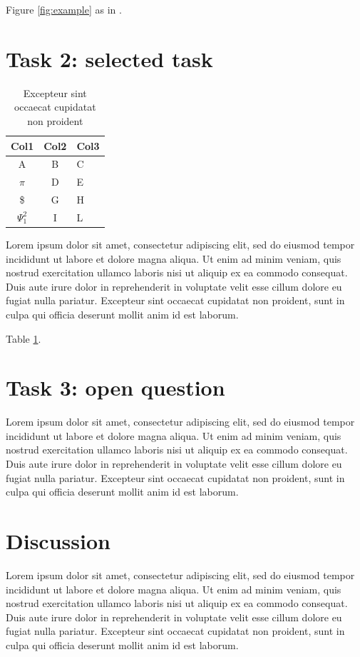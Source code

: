 \documentclass[sigchi]{acmart}
\begin{document}
Figure \ref{fig:example} as in \cite{lorem}.


\section{Task 2: selected task}

\begin{table}
  \caption{Excepteur sint occaecat cupidatat non proident}
  \label{tab:freq}
  \begin{tabular}{ccl}
    \toprule
    Col1 & Col2 & Col3\\
    \midrule
    A & B & C\\
    $\pi$ & D & E\\
    \$ & G & H\\
    $\Psi^2_1$ & I & L\\
  \bottomrule
\end{tabular}
\end{table}

Lorem ipsum dolor sit amet, consectetur adipiscing elit, sed do eiusmod tempor incididunt ut labore et dolore magna aliqua. Ut enim ad minim veniam, quis nostrud exercitation ullamco laboris nisi ut aliquip ex ea commodo consequat. Duis aute irure dolor in reprehenderit in voluptate velit esse cillum dolore eu fugiat nulla pariatur. Excepteur sint occaecat cupidatat non proident, sunt in culpa qui officia deserunt mollit anim id est laborum.

Table \ref{tab:freq}.

\section{Task 3: open question}

Lorem ipsum dolor sit amet, consectetur adipiscing elit, sed do eiusmod tempor incididunt ut labore et dolore magna aliqua. Ut enim ad minim veniam, quis nostrud exercitation ullamco laboris nisi ut aliquip ex ea commodo consequat. Duis aute irure dolor in reprehenderit in voluptate velit esse cillum dolore eu fugiat nulla pariatur. Excepteur sint occaecat cupidatat non proident, sunt in culpa qui officia deserunt mollit anim id est laborum.

\section{Discussion}

Lorem ipsum dolor sit amet, consectetur adipiscing elit, sed do eiusmod tempor incididunt ut labore et dolore magna aliqua. Ut enim ad minim veniam, quis nostrud exercitation ullamco laboris nisi ut aliquip ex ea commodo consequat. Duis aute irure dolor in reprehenderit in voluptate velit esse cillum dolore eu fugiat nulla pariatur. Excepteur sint occaecat cupidatat non proident, sunt in culpa qui officia deserunt mollit anim id est laborum.



\end{document}
